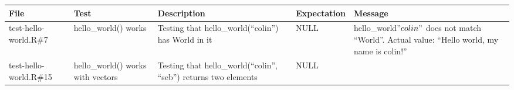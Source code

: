 \documentclass[
]{book}
\begin{document}
\begin{longtable}[]{@{}lllll@{}}
\toprule
\begin{minipage}[b]{0.07\columnwidth}\raggedright
File\strut
\end{minipage} & \begin{minipage}[b]{0.11\columnwidth}\raggedright
Test\strut
\end{minipage} & \begin{minipage}[b]{0.21\columnwidth}\raggedright
Description\strut
\end{minipage} & \begin{minipage}[b]{0.04\columnwidth}\raggedright
Expectation\strut
\end{minipage} & \begin{minipage}[b]{0.43\columnwidth}\raggedright
Message\strut
\end{minipage}\tabularnewline
\midrule
\endhead
\begin{minipage}[t]{0.07\columnwidth}\raggedright
test-hello-world.R\#7\strut
\end{minipage} & \begin{minipage}[t]{0.11\columnwidth}\raggedright
hello\_world() works\strut
\end{minipage} & \begin{minipage}[t]{0.21\columnwidth}\raggedright
Testing that hello\_world(``colin'') has World in it\strut
\end{minipage} & \begin{minipage}[t]{0.04\columnwidth}\raggedright
NULL\strut
\end{minipage} & \begin{minipage}[t]{0.43\columnwidth}\raggedright
hello\_world\("colin"\) does not match ``World''. Actual value: ``Hello world, my name is colin!''\strut
\end{minipage}\tabularnewline
\begin{minipage}[t]{0.07\columnwidth}\raggedright
test-hello-world.R\#15\strut
\end{minipage} & \begin{minipage}[t]{0.11\columnwidth}\raggedright
hello\_world() works with vectors\strut
\end{minipage} & \begin{minipage}[t]{0.21\columnwidth}\raggedright
Testing that hello\_world(``colin'', ``seb'') returns two elements\strut
\end{minipage} & \begin{minipage}[t]{0.04\columnwidth}\raggedright
NULL\strut
\end{minipage} & \begin{minipage}[t]{0.43\columnwidth}\raggedright

\end{minipage}
\end{longtable}
\end{document}
